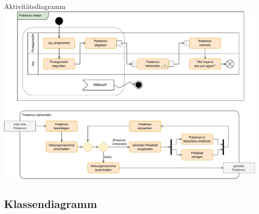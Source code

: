 \begin{example}{Aktivitätsdiagramm}
    \includegraphics[width=\textwidth]{includes/figures/example_diagrams_activity.pdf}
\end{example}

\subsection{Klassendiagramm}

